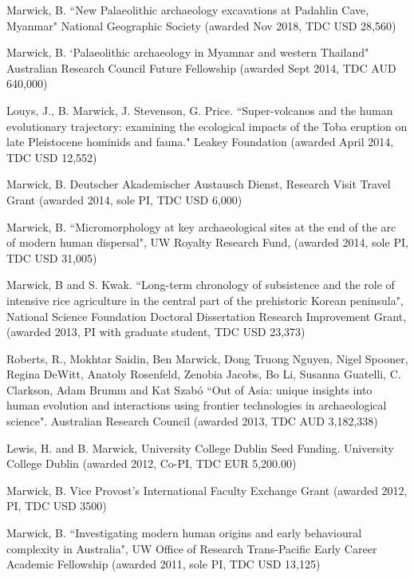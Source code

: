 \medskip

\ind  Marwick, B. ``New Palaeolithic archaeology excavations at Padahlin Cave, Myanmar" National Geographic Society (awarded Nov 2018, TDC USD 28,560)

\ind  Marwick, B. `Palaeolithic archaeology in Myamnar and western Thailand" Australian Research Council Future Fellowship (awarded Sept 2014, TDC AUD 640,000)

\ind  Louys, J., B. Marwick, J. Stevenson, G. Price. ``Super-volcanos and the human evolutionary trajectory: examining the ecological impacts of the Toba eruption on late Pleistocene hominids and fauna." Leakey Foundation (awarded April 2014, TDC USD 12,552)

\ind  Marwick, B. Deutscher Akademischer Austausch Dienst, Research Visit Travel Grant (awarded 2014, sole PI, TDC USD 6,000)

\ind  Marwick, B. ``Micromorphology at key archaeological sites at the end of the arc of modern human dispersal", UW Royalty Research Fund, (awarded 2014, sole PI, TDC USD 31,005)

\ind  Marwick, B and S. Kwak. ``Long-term chronology of subsistence and the role of intensive rice agriculture in the central part of the prehistoric Korean peninsula", National Science Foundation Doctoral Dissertation Research Improvement Grant, (awarded 2013,  PI with graduate student, TDC USD 23,373)

\ind  Roberts, R., Mokhtar Saidin, Ben Marwick, Dong Truong Nguyen, Nigel Spooner, Regina DeWitt, Anatoly Rosenfeld, Zenobia Jacobs, Bo Li, Susanna Guatelli, C. Clarkson, Adam Brumm and Kat Szabó ``Out of Asia: unique insights into human evolution and interactions using frontier technologies in archaeological science".  Australian Research Council (awarded 2013, TDC AUD 3,182,338)

\ind Lewis, H. and B. Marwick,  University College Dublin Seed Funding. University College Dublin (awarded 2012, Co-PI, TDC EUR 5,200.00) 

\ind Marwick, B. Vice Provost’s International Faculty Exchange Grant (awarded 2012, PI, TDC USD 3500)

\ind  Marwick, B. ``Investigating modern human origins and early behavioural complexity in Australia", UW Office of Research Trans-Pacific Early Career Academic Fellowship (awarded 2011, sole PI, TDC USD 13,125)

